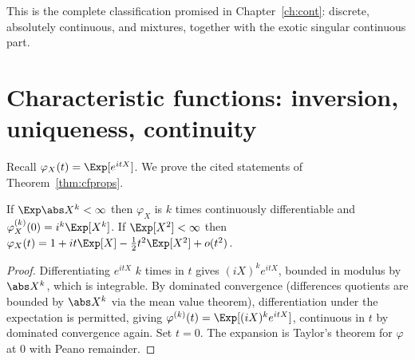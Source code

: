 This is the complete classification promised in Chapter~\ref{ch:cont}: discrete,
absolutely continuous, and mixtures, together with the exotic singular continuous part.

\section{Characteristic functions: inversion, uniqueness, continuity}

Recall $\varphi_X(t)=\Exp[e^{itX}]$. We prove the cited statements of
Theorem~\ref{thm:cfprops}.

\begin{theorem}\label{thm:cfmoments}
If $\Exp\abs X^k<\infty$ then $\varphi_X$ is $k$ times continuously differentiable and
$\varphi_X^{(k)}(0)=i^k\Exp[X^k]$. If $\Exp[X^2]<\infty$ then
$\varphi_X(t)=1+it\Exp[X]-\tfrac12t^2\Exp[X^2]+o(t^2)$.
\end{theorem}
\begin{proof}
Differentiating $e^{itX}$ $k$ times in $t$ gives $(iX)^ke^{itX}$, bounded in modulus by $\abs X^k$,
which is integrable. By dominated convergence (differences quotients are bounded by
$\abs X^k$ via the mean value theorem), differentiation under the expectation is permitted,
giving $\varphi^{(k)}(t)=\Exp[(iX)^ke^{itX}]$, continuous in $t$ by dominated convergence
again. Set $t=0$. The expansion is Taylor's theorem for $\varphi$ at $0$ with Peano remainder.
\end{proof}

